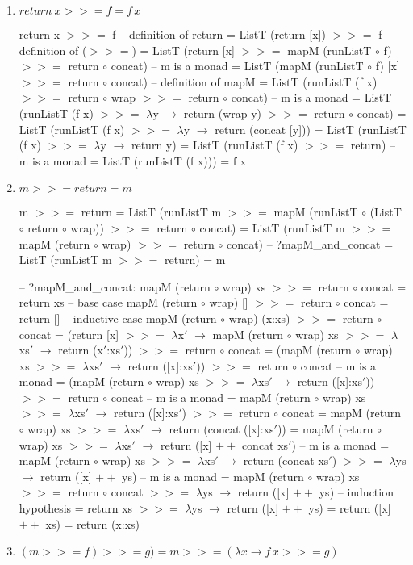\documentclass{article}
\newcommand{\hbind}{>\!\!\!>\!\!\!=}
\newcommand{\happend}{+\!\!\!+}
\begin{document}
\begin{enumerate}
\item $return\: x \hbind f = f\, x$
\begin{code}
   return x $\hbind$ f
-- definition of return
= ListT (return [x]) $\hbind$ f
-- definition of ($\hbind$)
= ListT (return [x] $\hbind$ mapM (runListT $\circ$ f) $\hbind$ return $\circ$ concat)
-- m is a monad
= ListT (mapM (runListT $\circ$ f) [x] $\hbind$ return $\circ$ concat)
-- definition of mapM
= ListT (runListT (f x) $\hbind$ return $\circ$ wrap $\hbind$ return $\circ$ concat)
-- m is a monad
= ListT (runListT (f x) $\hbind$ $\lambda$y $\to$ return (wrap y) $\hbind$ return $\circ$ concat)
= ListT (runListT (f x) $\hbind$ $\lambda$y $\to$ return (concat [y]))
= ListT (runListT (f x) $\hbind$ $\lambda$y $\to$ return y)
= ListT (runListT (f x) $\hbind$ return)
-- m is a monad
= ListT (runListT (f x)))
= f x
\end{code}
\item $m \hbind return = m$
\begin{code}
   m $\hbind$ return
= ListT (runListT m $\hbind$ mapM (runListT $\circ$ (ListT $\circ$ return $\circ$ wrap)) $\hbind$ return $\circ$ concat)
= ListT (runListT m $\hbind$ mapM (return $\circ$ wrap) $\hbind$ return $\circ$ concat)
-- ?mapM_and_concat
= ListT (runListT m $\hbind$ return)
= m

-- ?mapM_and_concat: mapM (return $\circ$ wrap) xs $\hbind$ return $\circ$ concat = return xs
-- base case
   mapM (return $\circ$ wrap) [] $\hbind$ return $\circ$ concat
= return []
-- inductive case
   mapM (return $\circ$ wrap) (x:xs) $\hbind$ return $\circ$ concat
= (return [x] $\hbind$ $\lambda$x$'$ $\to$ mapM (return $\circ$ wrap) xs $\hbind$ $\lambda$xs$'$ $\to$ return (x$'$:xs$'$)) $\hbind$ return $\circ$ concat
= (mapM (return $\circ$ wrap) xs $\hbind$ $\lambda$xs$'$ $\to$ return ([x]:xs$'$)) $\hbind$ return $\circ$ concat
-- m is a monad
= (mapM (return $\circ$ wrap) xs $\hbind$ $\lambda$xs$'$ $\to$ return ([x]:xs$'$)) $\hbind$ return $\circ$ concat
-- m is a monad
= mapM (return $\circ$ wrap) xs $\hbind$ $\lambda$xs$'$ $\to$ return ([x]:xs$'$) $\hbind$ return $\circ$ concat
= mapM (return $\circ$ wrap) xs $\hbind$ $\lambda$xs$'$ $\to$ return (concat ([x]:xs$'$))
= mapM (return $\circ$ wrap) xs $\hbind$ $\lambda$xs$'$ $\to$ return ([x] $\happend$ concat xs$'$)
-- m is a monad
= mapM (return $\circ$ wrap) xs $\hbind$ $\lambda$xs$'$ $\to$ return (concat xs$'$) $\hbind$ $\lambda$ys $\to$ return ([x] $\happend$ ys)
-- m is a monad
= mapM (return $\circ$ wrap) xs $\hbind$ return $\circ$ concat $\hbind$ $\lambda$ys $\to$ return ([x] $\happend$ ys)
-- induction hypothesis
= return xs $\hbind$ $\lambda$ys $\to$ return ([x] $\happend$ ys)
= return ([x] $\happend$ xs)
= return (x:xs)
\end{code}
\item $(m \hbind f) \hbind g) = m \hbind (\lambda x \to f\, x \hbind g)$
\end{enumerate}
\end{document}
